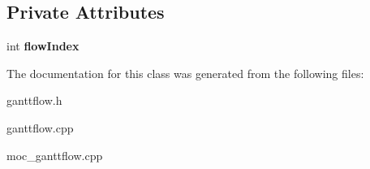 \subsection*{Private Attributes}
\begin{DoxyCompactItemize}
\item 
\hypertarget{class_gantt_flow_adad338ed721f9d3881da17042c2cd66f}{}int {\bfseries flow\+Index}\label{class_gantt_flow_adad338ed721f9d3881da17042c2cd66f}

\end{DoxyCompactItemize}


The documentation for this class was generated from the following files\+:\begin{DoxyCompactItemize}
\item 
ganttflow.\+h\item 
ganttflow.\+cpp\item 
moc\+\_\+ganttflow.\+cpp\end{DoxyCompactItemize}
